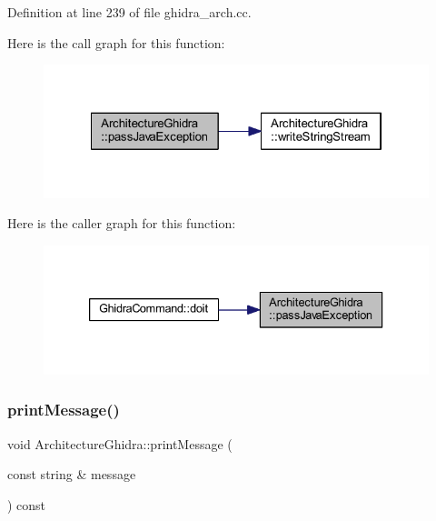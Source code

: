 Definition at line 239 of file ghidra\+\_\+arch.\+cc.

Here is the call graph for this function\+:
\nopagebreak
\begin{figure}[H]
\begin{center}
\leavevmode
\includegraphics[width=322pt]{class_architecture_ghidra_afed66db0ba46a6c4bb1c42e173d021fa_cgraph}
\end{center}
\end{figure}
Here is the caller graph for this function\+:
\nopagebreak
\begin{figure}[H]
\begin{center}
\leavevmode
\includegraphics[width=333pt]{class_architecture_ghidra_afed66db0ba46a6c4bb1c42e173d021fa_icgraph}
\end{center}
\end{figure}
\mbox{\label{class_architecture_ghidra_ae7cdac6309428d288bc2317f9997aa4e}} 
\subsubsection{\texorpdfstring{printMessage()}{printMessage()}}
{\footnotesize\ttfamily void Architecture\+Ghidra\+::print\+Message (\begin{DoxyParamCaption}\item[{const string \&}]{message }\end{DoxyParamCaption}) const\hspace{0.3cm}{\ttfamily [virtual]}}



